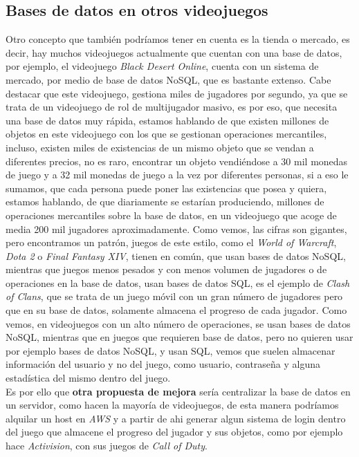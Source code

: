 \documentclass[a4paper]{article}
\begin{document}
\subsection{Bases de datos en otros videojuegos}
Otro concepto que también podríamos tener en cuenta es la tienda o mercado, es decir, hay muchos videojuegos actualmente que cuentan con una base de datos, por ejemplo, el videojuego \textit{Black Desert Online}, cuenta con un sistema de mercado, por medio de base de datos NoSQL, que es bastante extenso.
Cabe destacar que este videojuego, gestiona miles de jugadores por segundo, ya que se trata de un videojuego de rol de multijugador masivo, es por eso, que necesita una base de datos muy rápida, estamos hablando de que existen millones de objetos en este videojuego con los que se gestionan operaciones mercantiles,
incluso, existen miles de existencias de un mismo objeto que se vendan a diferentes precios, no es raro, encontrar un objeto vendiéndose a 30 mil monedas de juego y a 32 mil monedas de juego a la vez por diferentes personas, si a eso le sumamos, que cada persona puede poner las existencias que posea y quiera, estamos hablando,
de que diariamente se estarían produciendo, millones de operaciones mercantiles sobre la base de datos, en un videojuego que acoge de media 200 mil jugadores aproximadamente. Como vemos, las cifras son gigantes, pero encontramos un patrón, juegos de este estilo, como el \textit{World of Warcraft}, \textit{Dota 2} o \textit{Final Fantasy XIV}, tienen en común,
que usan bases de datos NoSQL, mientras que juegos menos pesados y con menos volumen de jugadores o de operaciones en la base de datos, usan bases de datos SQL, es el ejemplo de \textit{Clash of Clans}, que se trata de un juego móvil con un gran número de jugadores pero que en su base de datos, solamente almacena el progreso de cada jugador.
Como vemos, en videojuegos con un alto número de operaciones, se usan bases de datos NoSQL, mientras que en juegos que requieren base de datos, pero no quieren usar por ejemplo bases de datos NoSQL, y usan SQL, vemos que suelen almacenar información del usuario y no del juego, como usuario, contraseña y alguna estadística del mismo dentro del juego.\\
Es por ello que \textbf{otra propuesta de mejora} sería centralizar la base de datos en un servidor, como hacen la mayoría de videojuegos, de esta manera podríamos alquilar un host en \textit{AWS} y a partir de ahi generar algun sistema de login dentro del juego que almacene el progreso del jugador y sus objetos, como por ejemplo hace \textit{Activision}, con sus juegos de \textit{Call of Duty}.
\end{document}
